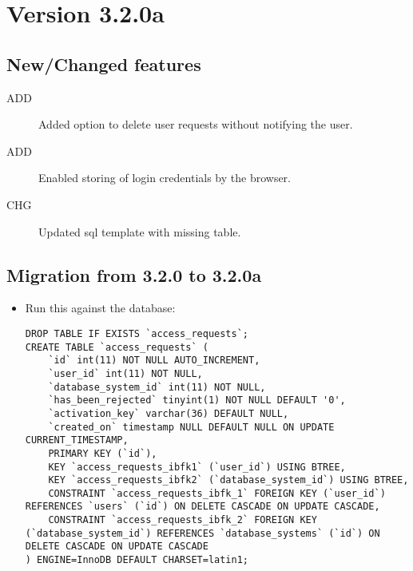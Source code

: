 \section{Version 3.2.0a}
\label{sec:3.2.0a}

\subsection{New/Changed features}
\begin{description}
	\item[ADD] Added option to delete user requests without notifying the user.
	\item[ADD] Enabled storing of login credentials by the browser.
	\item[CHG] Updated sql template with missing table.
\end{description}

\subsection{Migration from 3.2.0 to 3.2.0a}
\begin{itemize}

	\item Run this against the database:
	\begin{lstlisting}[style=SQL]
DROP TABLE IF EXISTS `access_requests`;
CREATE TABLE `access_requests` (
	`id` int(11) NOT NULL AUTO_INCREMENT,
	`user_id` int(11) NOT NULL,
	`database_system_id` int(11) NOT NULL,
	`has_been_rejected` tinyint(1) NOT NULL DEFAULT '0',
	`activation_key` varchar(36) DEFAULT NULL,
	`created_on` timestamp NULL DEFAULT NULL ON UPDATE CURRENT_TIMESTAMP,
	PRIMARY KEY (`id`),
	KEY `access_requests_ibfk1` (`user_id`) USING BTREE,
	KEY `access_requests_ibfk2` (`database_system_id`) USING BTREE,
	CONSTRAINT `access_requests_ibfk_1` FOREIGN KEY (`user_id`) REFERENCES `users` (`id`) ON DELETE CASCADE ON UPDATE CASCADE,
	CONSTRAINT `access_requests_ibfk_2` FOREIGN KEY (`database_system_id`) REFERENCES `database_systems` (`id`) ON DELETE CASCADE ON UPDATE CASCADE
) ENGINE=InnoDB DEFAULT CHARSET=latin1;
	\end{lstlisting}
\end{itemize}